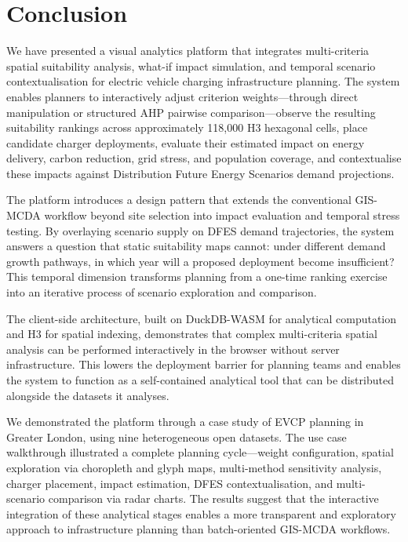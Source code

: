 
\section{Conclusion}
\label{sec:conclusion}

We have presented a visual analytics platform that integrates multi-criteria spatial suitability analysis, what-if impact simulation, and temporal scenario contextualisation for electric vehicle charging infrastructure planning. The system enables planners to interactively adjust criterion weights---through direct manipulation or structured AHP pairwise comparison---observe the resulting suitability rankings across approximately 118,000 H3 hexagonal cells, place candidate charger deployments, evaluate their estimated impact on energy delivery, carbon reduction, grid stress, and population coverage, and contextualise these impacts against Distribution Future Energy Scenarios demand projections.

The platform introduces a design pattern that extends the conventional GIS-MCDA workflow beyond site selection into impact evaluation and temporal stress testing. By overlaying scenario supply on DFES demand trajectories, the system answers a question that static suitability maps cannot: under different demand growth pathways, in which year will a proposed deployment become insufficient? This temporal dimension transforms planning from a one-time ranking exercise into an iterative process of scenario exploration and comparison.

The client-side architecture, built on DuckDB-WASM for analytical computation and H3 for spatial indexing, demonstrates that complex multi-criteria spatial analysis can be performed interactively in the browser without server infrastructure. This lowers the deployment barrier for planning teams and enables the system to function as a self-contained analytical tool that can be distributed alongside the datasets it analyses.

We demonstrated the platform through a case study of EVCP planning in Greater London, using nine heterogeneous open datasets. The use case walkthrough illustrated a complete planning cycle---weight configuration, spatial exploration via choropleth and glyph maps, multi-method sensitivity analysis, charger placement, impact estimation, DFES contextualisation, and multi-scenario comparison via radar charts. The results suggest that the interactive integration of these analytical stages enables a more transparent and exploratory approach to infrastructure planning than batch-oriented GIS-MCDA workflows.

